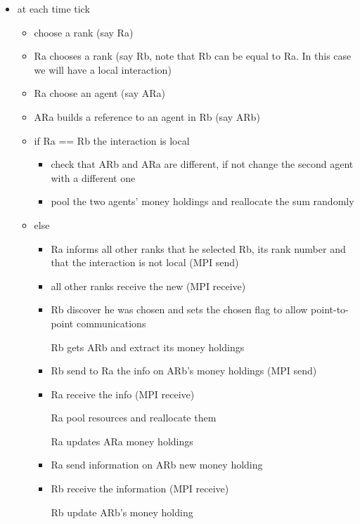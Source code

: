\documentclass{article}
\providecommand{\tightlist}{%
  \setlength{\itemsep}{0pt}\setlength{\parskip}{0pt}}
\begin{document}
\begin{itemize}
\tightlist
\item
  at each time tick

  \begin{itemize}
  \tightlist
  \item
    choose a rank (say Ra)
  \item
	  Ra chooses a rank (say Rb, note that Rb can be equal to Ra. In this case we will have a local interaction)
  \item
    Ra choose an agent (say ARa)
   \item
	   ARa builds a reference to an agent in Rb (say ARb)
  \item
    if Ra == Rb the interaction is local
    \begin{itemize}
		    \tightlist
    \item
	    check that ARb and ARa are different, if not change the second agent with a different one
    \item
      pool the two agents' money holdings and reallocate the sum randomly
    \end{itemize}
  \item
    else

    \begin{itemize}
    \tightlist
    \item
	    Ra informs all other ranks that he selected Rb, its rank number and that the interaction is not local (MPI send)
    \item
	    all other ranks receive the new (MPI receive)
    \item
	    Rb discover he was chosen and sets the chosen flag to allow point-to-point communications
	    
	    Rb gets ARb and extract its money holdings
    \item
	    Rb send to Ra the info on ARb's money holdings (MPI send)
    \item
	    Ra receive the info (MPI receive)

	    Ra pool resources and reallocate them

	    Ra updates ARa money holdings
    \item
	    Ra send information on ARb new money holding
    \item
	    Rb receive the information (MPI receive)

	    Rb update ARb's money holding
    \end{itemize}
  \end{itemize}
\end{itemize}
\end{document}
